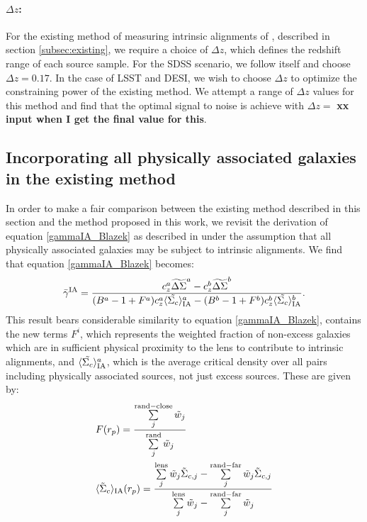 \documentclass[a4paper,fleqn,usenatbib]{mnras}
\begin{document}
\paragraph*{$\Delta z$:} For the existing method of measuring intrinsic alignments of \cite{Blazek2012}, described in section \ref{subsec:existing}, we require a choice of $\Delta z$, which defines the redshift range of each source sample. For the SDSS scenario, we follow \cite{Blazek2012} itself and choose $\Delta z = 0.17$. In the case of LSST and DESI, we wish to choose $\Delta z$ to optimize the constraining power of the existing method. We attempt a range of $\Delta z$ values for this method and find that the optimal signal to noise is achieve with $\Delta z =$ {\bf xx input when I get the final value for this}.

\subsection{Incorporating all physically associated galaxies in the existing method}
\label{subsec:notjustexcess}
\noindent
In order to make a fair comparison between the existing method described in this section and the method proposed in this work, we revisit the derivation of equation \ref{gammaIA_Blazek} as described in \cite{Blazek2012} under the assumption that all physically associated galaxies may be subject to intrinsic alignments. We find that equation \ref{gammaIA_Blazek} becomes:
\begin{equation}
\bar{\gamma}^{\rm IA} = \frac{c_z^a \widetilde{\Delta\Sigma}^a - c_z^b \widetilde{\Delta\Sigma}^b}{(B^a-1+F^a)c_z^a \langle \tilde{\Sigma_c}\rangle_{\rm IA}^a -(B^b-1+F^b)c_z^b \langle \tilde{\Sigma_c}\rangle_{\rm IA}^b}.
\label{gammaIA_allphys}
\end{equation}
This result bears considerable similarity to equation \ref{gammaIA_Blazek}, contains the new terms $F^i$, which represents the weighted fraction of non-excess galaxies which are in sufficient physical proximity to the lens to contribute to intrinsic alignments, and $\langle \tilde{\Sigma_c}\rangle_{\rm IA}^a$, which is the average critical density over all pairs including physically associated sources, not just excess sources. These are given by:
\begin{align}
&F(r_p)= \frac{\sum\limits_{j}^{\rm rand-close}\tilde{w}_j}{\sum\limits_{j}^{\rm rand} \tilde{w}_j}  \label{F} \\
&\langle \tilde{\Sigma}_c\rangle_{\rm IA} (r_p) =  \frac{\sum\limits_{j}^{\rm lens} \tilde{w}_j \tilde{\Sigma}_{c,j}- \sum\limits_{j}^{\rm rand-far} \tilde{w}_j \tilde{\Sigma}_{c,j}}{\sum\limits_{j}^{\rm lens} \tilde{w}_j - \sum\limits_{j}^{\rm rand-far} \tilde{w}_j}\label{SigIA}
\end{align}
\end{document}
